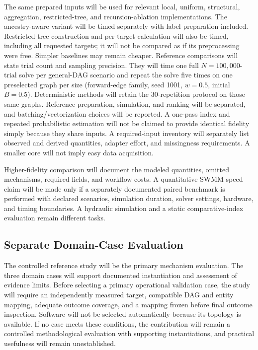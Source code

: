 The same prepared inputs will be used for relevant local, uniform, structural,
aggregation, restricted-tree, and recursion-ablation implementations. The ancestry-aware variant
will be timed separately with label preparation included. Restricted-tree
construction and per-target calculation will also be timed, including all
requested targets; it will not be compared as if its preprocessing were free. Simpler baselines may
remain cheaper. Reference comparisons will state trial count and sampling
precision. They will time one full $N=100{,}000$-trial solve per general-DAG
scenario and repeat the solve five times on one preselected graph per size
(forward-edge family, seed 1001, $w=0.5$, initial $B=0.5$). Deterministic methods will retain the
30-repetition protocol on those same graphs. Reference preparation, simulation,
and ranking will be separated, and batching/vectorization choices will be
reported. A one-pass index and repeated probabilistic estimation will not be
claimed to provide identical fidelity simply because they share inputs. A required-input inventory will separately list observed and
derived quantities, adapter effort, and missingness requirements.
A smaller core will not imply easy data acquisition.

Higher-fidelity comparison will document the modeled quantities, omitted
mechanisms, required fields, and workflow costs. A quantitative SWMM speed
claim will be made only if a separately documented paired benchmark is
performed with declared scenarios, simulation duration, solver settings,
hardware, and timing boundaries. A hydraulic simulation and a static
comparative-index evaluation remain different tasks.

\subsection{Separate Domain-Case Evaluation}\label{domain-evaluation}

The controlled reference study will be the primary mechanism evaluation.
The three domain cases will support documented instantiation and assessment
of evidence limits. Before selecting a primary operational validation case,
the study will require an independently measured target, compatible DAG and
entity mapping, adequate outcome coverage, and a mapping frozen before final
outcome inspection. Software will not be selected automatically because its
topology is available. If no case meets these conditions, the contribution
will remain a controlled methodological evaluation with supporting
instantiations, and practical usefulness will remain unestablished.

